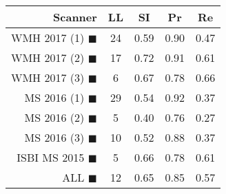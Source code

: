 \begin{tabular}{rcccc}
\toprule
Scanner & LL & SI & Pr & Re \\
\midrule
WMH 2017 (1) {\color[rgb]{ 1.00 0.00 0.00}$\blacksquare$} & 24 & 0.59 & 0.90 & 0.47 \\
WMH 2017 (2) {\color[rgb]{ 1.00 0.50 0.00}$\blacksquare$} & 17 & 0.72 & 0.91 & 0.61 \\
WMH 2017 (3) {\color[rgb]{ 1.00 0.80 0.00}$\blacksquare$} & 6 & 0.67 & 0.78 & 0.66 \\
MS  2016 (1) {\color[rgb]{ 0.20 0.80 0.00}$\blacksquare$} & 29 & 0.54 & 0.92 & 0.37 \\
MS  2016 (2) {\color[rgb]{ 0.00 0.40 1.00}$\blacksquare$} & 5 & 0.40 & 0.76 & 0.27 \\
MS  2016 (3) {\color[rgb]{ 0.60 0.00 1.00}$\blacksquare$} & 10 & 0.52 & 0.88 & 0.37 \\
ISBI MS 2015 {\color[rgb]{ 1.00 0.00 1.00}$\blacksquare$} & 5 & 0.66 & 0.78 & 0.61 \\
\midrule
ALL {\color[rgb]{ 1.00 1.00 1.00}$\blacksquare$} & 12 & 0.65 & 0.85 & 0.57 \\
\bottomrule
\end{tabular}